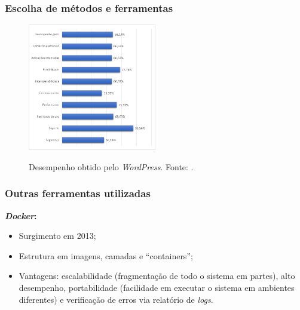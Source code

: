 \documentclass{beamer}
\begin{document}
\begin{frame}
    \frametitle{Escolha de métodos e ferramentas}
    
    \begin{figure}[htb]
        \centering
        \caption{Desempenho obtido pelo \textit{WordPress}. Fonte: \cite{elias}.}
        \includegraphics[width=0.5\textwidth]{../figuras/desempenho-wordpress}
        \label{wordpress}
    \end{figure}
        
\end{frame}


\begin{frame}
    \frametitle{Outras ferramentas utilizadas}
    \textbf{\textit{Docker}:} 
    \begin{itemize}
        \item Surgimento em 2013;
        \item Estrutura em imagens, camadas e ``containers'';
        \item Vantagens: escalabilidade (fragmentação de todo o sistema em partes), alto desempenho, portabilidade (facilidade em executar o sistema em ambientes diferentes) e verificação de erros via relatório de \textit{logs}. 
        
% 
% 

    \end{itemize}
    
\end{frame}
\end{document}
